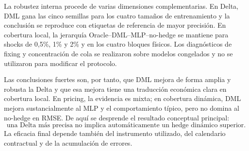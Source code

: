 La robustez interna procede de varias dimensiones complementarias. En Delta, DML gana las
cinco semillas para los cuatro tamaños de entrenamiento y la conclusión se reproduce con
etiquetas de referencia de mayor precisión. En cobertura local, la jerarquía
Oracle--DML--MLP--no-hedge se mantiene para shocks de 0{,}5\%, 1\% y 2\% y
en los cuatro bloques físicos. Los diagnósticos de fixing y concentración de cola se realizaron
sobre modelos congelados y no se utilizaron para modificar el protocolo.

Las conclusiones fuertes son, por tanto, que DML mejora de forma amplia y robusta la Delta
y que esa mejora tiene una traducción económica clara en cobertura local. En pricing, la
evidencia es mixta; en cobertura dinámica, DML mejora sustancialmente al MLP y el
comportamiento típico, pero no domina al no-hedge en RMSE. De aquí se desprende el
resultado conceptual principal:
\[
    \text{una Delta más precisa no implica automáticamente un hedge dinámico superior.}
\]
La eficacia final depende también del instrumento utilizado, del calendario contractual y de la
acumulación de errores.

